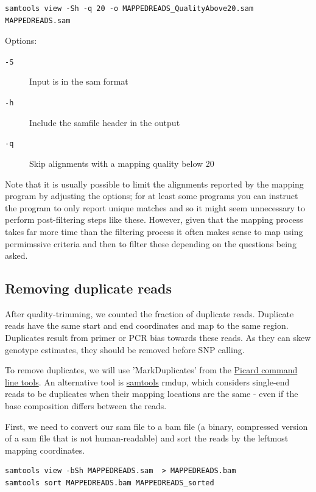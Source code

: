 \documentclass[11pt]{article}
\begin{document}
\begin{verbatim}
samtools view -Sh -q 20 -o MAPPEDREADS_QualityAbove20.sam MAPPEDREADS.sam
\end{verbatim}

Options:

\begin{description}
\item[{\texttt{-S}}] Input is in the sam format
\item[{\texttt{-h}}] Include the samfile header in the output
\item[{\texttt{-q}}] Skip alignments with a mapping quality below 20
\end{description}

Note that it is usually possible to limit the alignments reported by the
mapping program by adjusting the options; for at least some programs you can
instruct the program to only report unique matches and so it might seem
unnecessary to perform post-filtering steps like these. However, given that
the mapping process takes far more time than the filtering process it often
makes sense to map using permimssive criteria and then to filter these
depending on the questions being asked.

\subsection{Removing duplicate reads}
\label{sec-2-1}
After quality-trimming, we counted the fraction of duplicate
reads. Duplicate reads have the same start and end
coordinates and map to the same region. Duplicates result from primer
or PCR bias towards these reads. As they can skew genotype estimates,
they should be removed before SNP calling.

To remove duplicates, we will use 'MarkDuplicates' from the \href{https://broadinstitute.github.io/picard/command-line-overview.html}{Picard
command line tools}. An alternative tool is \href{http://samtools.sourceforge.net/samtools.shtml}{samtools} rmdup, which
considers single-end reads to be duplicates when their mapping
locations are the same - even if the base composition differs between
the reads.

First, we need to convert our sam file to a bam file (a binary,
compressed version of a sam file that is not human-readable) and sort
the reads by the leftmost mapping coordinates.

\begin{verbatim}
samtools view -bSh MAPPEDREADS.sam  > MAPPEDREADS.bam
samtools sort MAPPEDREADS.bam MAPPEDREADS_sorted
\end{verbatim}
\end{document}

